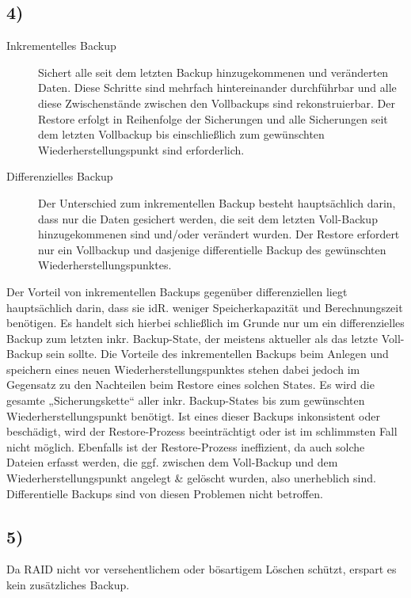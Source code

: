 \documentclass[ngerman]{fbi-aufgabenblatt}
\begin{document}
	\subsection*{4)}
	\begin{description}
	\item[Inkrementelles Backup] 
	Sichert alle seit dem letzten Backup hinzugekommenen und veränderten Daten.
	Diese Schritte sind mehrfach hintereinander durchführbar und alle diese Zwischenstände zwischen den Vollbackups sind rekonstruierbar. Der Restore erfolgt in Reihenfolge der Sicherungen und alle Sicherungen seit dem letzten Vollbackup bis einschließlich zum gewünschten Wiederherstellungspunkt sind erforderlich. 
	
	\item [Differenzielles Backup] 
	Der Unterschied zum inkrementellen Backup besteht hauptsächlich darin, dass nur die Daten gesichert werden, die seit dem letzten Voll-Backup hinzugekommenen sind und/oder verändert wurden.
	Der Restore erfordert nur ein Vollbackup und dasjenige differentielle Backup des gewünschten Wiederherstellungspunktes. 
	\end{description} 
	Der Vorteil von inkrementellen Backups gegenüber differenziellen liegt hauptsächlich darin, dass sie idR. weniger Speicherkapazität und Berechnungszeit benötigen. Es handelt sich hierbei schließlich im Grunde nur um ein differenzielles Backup zum letzten inkr. Backup-State, der meistens aktueller als das letzte Voll-Backup sein sollte. Die Vorteile des inkrementellen Backups beim Anlegen und speichern eines neuen Wiederherstellungspunktes stehen dabei jedoch im Gegensatz zu den Nachteilen beim Restore eines solchen States. Es wird die gesamte „Sicherungskette“ aller inkr. Backup-States bis zum gewünschten Wiederherstellungspunkt benötigt. Ist eines dieser Backups inkonsistent oder beschädigt, wird der Restore-Prozess beeinträchtigt oder ist im schlimmsten Fall nicht möglich. Ebenfalls ist der Restore-Prozess ineffizient, da auch solche Dateien erfasst werden, die ggf. zwischen dem Voll-Backup und dem Wiederherstellungspunkt angelegt \& gelöscht wurden, also unerheblich sind. Differentielle Backups sind von diesen Problemen nicht betroffen.

\subsection*{5)}
Da RAID nicht vor versehentlichem oder bösartigem Löschen schützt, erspart es kein zusätzliches Backup.
\end{document}
